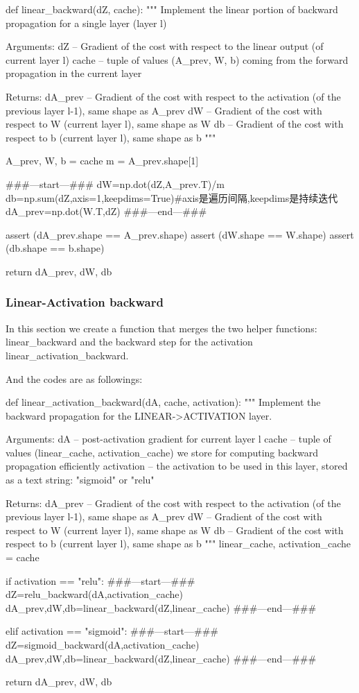 \documentclass[12pt,a4paper]{article}
\begin{document}
		\begin{python}
			def linear_backward(dZ, cache):
			"""
			Implement the linear portion of backward propagation for a single layer (layer l)
			
			Arguments:
			dZ -- Gradient of the cost with respect to the linear output (of current layer l)
			cache -- tuple of values (A_prev, W, b) coming from the forward propagation in the current layer
			
			Returns:
			dA_prev -- Gradient of the cost with respect to the activation (of the previous layer l-1), same shape as A_prev
			dW -- Gradient of the cost with respect to W (current layer l), same shape as W
			db -- Gradient of the cost with respect to b (current layer l), same shape as b
			"""
			
			A_prev, W, b = cache
			m = A_prev.shape[1]
			
			###---start---###
			dW=np.dot(dZ,A_prev.T)/m
			db=np.sum(dZ,axis=1,keepdims=True)#axis是遍历间隔,keepdims是持续迭代
			dA_prev=np.dot(W.T,dZ)
			###---end---###
			
			assert (dA_prev.shape == A_prev.shape)
			assert (dW.shape == W.shape)
			assert (db.shape == b.shape)
			
			return dA_prev, dW, db
			
		\end{python}
	\newpage
		\subsubsection{Linear-Activation backward}
			In this section we create a function that merges the two helper functions: linear\_backward and the backward step for the activation linear\_activation\_backward.\par
			And the codes are as followings:\par
			\begin{python}
				def linear_activation_backward(dA, cache, activation):
				"""
				Implement the backward propagation for the LINEAR->ACTIVATION layer.
				
				Arguments:
				dA -- post-activation gradient for current layer l
				cache -- tuple of values (linear_cache, activation_cache) we store for computing backward propagation efficiently
				activation -- the activation to be used in this layer, stored as a text string: "sigmoid" or "relu"
				
				Returns:
				dA_prev -- Gradient of the cost with respect to the activation (of the previous layer l-1), same shape as A_prev
				dW -- Gradient of the cost with respect to W (current layer l), same shape as W
				db -- Gradient of the cost with respect to b (current layer l), same shape as b
				"""
				linear_cache, activation_cache = cache
				
				if activation == "relu":
				###---start---### 
				dZ=relu_backward(dA,activation_cache)
				dA_prev,dW,db=linear_backward(dZ,linear_cache)
				###---end---###
				
				elif activation == "sigmoid":
				###---start---### 
				dZ=sigmoid_backward(dA,activation_cache)
				dA_prev,dW,db=linear_backward(dZ,linear_cache)
				###---end---###
				
				return dA_prev, dW, db
			\end{python}
		\newpage
\end{document}
